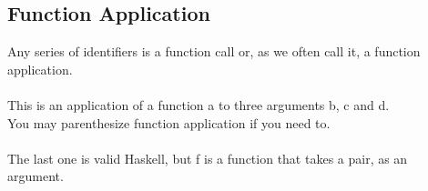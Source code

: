\subsection{Function Application}
Any series of identifiers is a function call or, as we often call it, a function application.\\
\\
This is an application of a function a to three arguments b, c and d.\\
You may parenthesize function application if you need to.\\
\\
The last one is valid Haskell, but f is a function that takes a pair,  as an argument.
